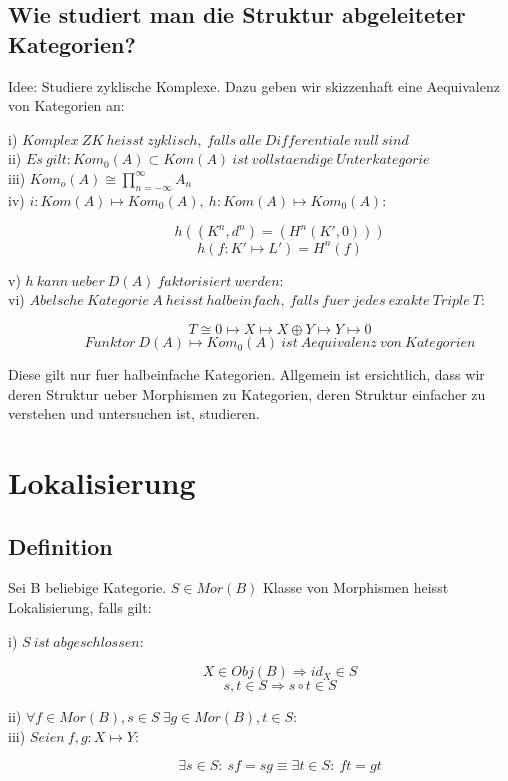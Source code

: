 \documentclass[12pt]{article}
\begin{document}
\subsection{Wie studiert man die Struktur abgeleiteter Kategorien?}

Idee: Studiere zyklische Komplexe. Dazu geben wir skizzenhaft eine Aequivalenz von Kategorien an:\\
\begin{description}
    \item[i) $Komplex \: ZK \: heisst \: zyklisch, \: falls \: alle \: Differentiale \: null \: sind$]
    \item[ii) $Es \: gilt: Kom_0(A) \subset Kom(A) \: ist \: vollstaendige \: Unterkategorie$]  
    \item[iii) $Kom_o(A) \cong \prod_{n=-\infty}^\infty A_n$]
    \item[iv) $i : Kom(A) \mapsto Kom_0(A), \: h : Kom(A) \mapsto Kom_0(A)$:]
        \[h((K^n,d^n) = (H^n(K',0)))\]
        \[h(f:K' \mapsto L') = H^n(f)\]
    \item[v) $h \: kann  \: ueber \: D(A) \: faktorisiert \: werden$:]
    \item[vi) $Abelsche \: Kategorie \: A \: heisst \: halbeinfach, \: falls \: fuer \: jedes \: exakte \: Triple \: T$:]
        \[T \cong 0 \mapsto X \mapsto X \oplus Y \mapsto Y \mapsto 0\]
        \[Funktor \: D(A) \mapsto Kom_0(A) \: ist \: Aequivalenz \: von \: Kategorien\]
\end{description}
Diese gilt nur fuer halbeinfache Kategorien. Allgemein ist ersichtlich, dass wir deren Struktur ueber Morphismen
zu Kategorien, deren Struktur einfacher zu verstehen und untersuchen ist, studieren.

\section{Lokalisierung}
\subsection{Definition}

Sei B beliebige Kategorie. $S \in Mor(B)$ Klasse von Morphismen heisst Lokalisierung, falls gilt:
\begin{description}
    \item[i) $S \: ist \: abgeschlossen$:]
        \[X \in Obj(B) \Rightarrow id_X \in S\]
        \[s,t \in S \Rightarrow s \circ t \in S\]
    \item[ii) $\forall f \in Mor(B), s \in S \: \exists g \in Mor(B), t \in S$:]
    \item[iii) $Seien \: f,g : X \mapsto Y$:]
        \[\exists s \in S: \: sf = sg \equiv \exists t \in S: \: ft = gt\]
\end{description}
\end{document}
